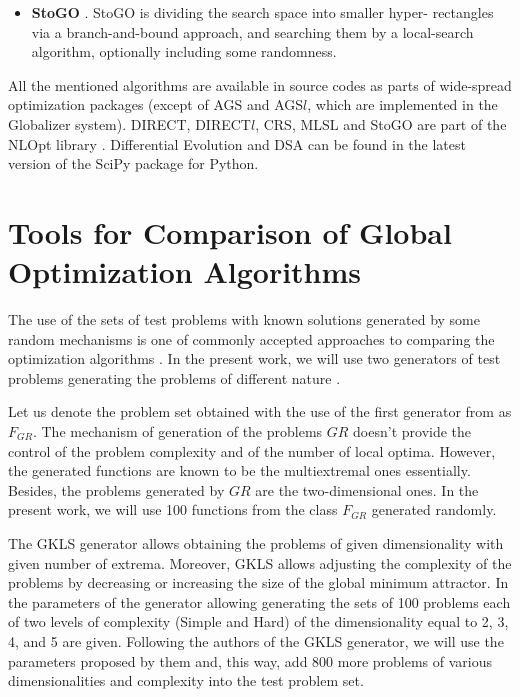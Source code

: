 \documentclass{svproc}
\begin{document}
\begin{itemize}
  \item \textbf{StoGO} \cite{Madsen1998}. StoGO is dividing the search space into smaller hyper-
rectangles via a branch-and-bound approach,
  and searching them by a local-search algorithm, optionally including some randomness.

\end{itemize}

All the mentioned algorithms are available in source codes as parts of wide-spread optimization packages (except of AGS and AGS\(l\), which are implemented in the Globalizer system).
DIRECT, DIRECT$l$, CRS, MLSL and StoGO are part of the NLOpt library \cite{nlopt}.
Differential Evolution and DSA can be found in
the latest version of the SciPy \cite{scipy} package for Python.

\section{Tools for Comparison of Global Optimization Algorithms}


The use of the sets of test problems with known solutions generated by some random mechanisms is
one of commonly accepted approaches to comparing the optimization algorithms
\cite{Beiranvand2017}. In the present work, we will use two generators of test problems generating
the problems of different nature \cite{grishaginClass, Gaviano2003}.

Let us denote the problem set obtained with the use of the first generator from \cite{grishaginClass}
as \(F_{GR}\). The mechanism of generation of the problems \(GR\) doesn't provide the
control of the problem complexity and of the number of local optima. However, the generated
functions are known to be the multiextremal ones essentially. Besides, the problems generated by
\(GR\) are the two-dimensional ones. In the present work, we will use 100 functions from the
class \(F_{GR}\) generated randomly.

The GKLS generator \cite{Gaviano2003} allows obtaining the problems of given dimensionality
with given number of extrema. Moreover, GKLS allows adjusting the complexity of the problems by
decreasing or increasing the size of the global minimum attractor. In
\cite{SergeyevKvasov2006} the parameters of the generator allowing generating the sets of 100
problems each of two levels of complexity (Simple and Hard) of the dimensionality equal to 2, 3, 4,
and 5 are given. Following the authors of the GKLS generator, we will use the parameters proposed
by them and, this way, add 800 more problems of various dimensionalities and complexity into the
test problem set.
\end{document}
